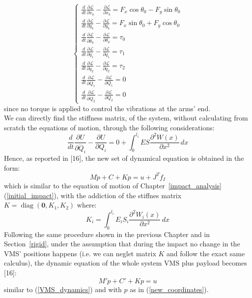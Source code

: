 \documentclass[a4paper,12pt,oneside]{report}
\begin{document}
\begin{equation}
  \begin{cases}
    \frac{d}{dt}\frac{\partial \mathcal{L} }{\partial \dot{x}_b}-\frac{\partial \mathcal{L} }{\partial x_b}=F_x\cos{\theta_0}-F_y\sin{\theta_0}\\
    \frac{d}{dt}\frac{\partial \mathcal{L} }{\partial \dot{y}_b}-\frac{\partial \mathcal{L} }{\partial y_b}=F_x\sin{\theta_0}+F_y\cos{\theta_0}\\
    \frac{d}{dt}\frac{\partial \mathcal{L} }{\partial \dot{\theta}_0}-\frac{\partial \mathcal{L} }{\partial \theta_0}=\tau_0\\
    \frac{d}{dt}\frac{\partial \mathcal{L} }{\partial \dot{q}_1}-\frac{\partial \mathcal{L} }{\partial q_1}=\tau_1\\
    \frac{d}{dt}\frac{\partial \mathcal{L} }{\partial \dot{q}_2}-\frac{\partial \mathcal{L} }{\partial q_2}=\tau_2\\
    \frac{d}{dt}\frac{\partial \mathcal{L} }{\partial \dot{Q}_1}-\frac{\partial \mathcal{L} }{\partial Q_1}=0\\
    \frac{d}{dt}\frac{\partial \mathcal{L} }{\partial \dot{Q}_2}-\frac{\partial \mathcal{L} }{\partial Q_2}=0
  \end{cases}
\end{equation}
since no torque is applied to control the vibrations at the arms' end.\\
We can directly find the stiffness matrix, of the system, without calculating from scratch the equations of motion, through the following considerations:
\begin{equation}
  \frac{d}{dt}\frac{\partial U}{\partial \dot{Q}_i}-\frac{\partial U}{\partial Q_i}=0+\int_{0}^{l_i}ES\frac{\partial^2 W(x)}{\partial x^2}\,dx
\end{equation}
Hence, as reported in [16], the new set of dynamical equation is obtained in the form:
\begin{equation}
  M\ddot{p}+C+Kp=u+J^Tf_I
\end{equation}
which is similar to the equation of motion of Chapter~\ref{impact_analysis} (\ref{initial_impact}), with the addiction of the stiffnes matrix $K=\operatorname{diag}(\textbf{0},K_1,K_2)$ where:
\begin{equation}
  K_i=\int_{0}^{l_i}E_iS_i\frac{\partial^2 W_i(x)}{\partial x^2}\,dx
\end{equation}
Following the same procedure shown in the previous Chapter and in Section~\ref{rigid}, under the assumption that during the impact no change in the VMS' positions happens (i.e. we can neglet matrix $K$ and follow the exact same calculus), the dynamic equation of the whole system VMS plus payload becomes [16]:
\begin{equation}
  M'\ddot{p}+C'+Kp=u
\end{equation}
similar to (\ref{VMS_dynamics}) and with $p$ as in (\ref{new_coordinates}).
\newpage
\end{document}
